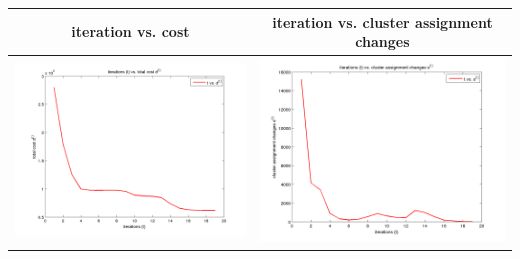 \documentclass[fleqn]{article}
\begin{document}
\begin{center}
  \begin{longtable}{ c | c }
	\multicolumn{1}{c}{iteration vs. cost} & 
	\multicolumn{1}{c}{iteration vs. cluster assignment changes}  \\
    \hline
    \includegraphics[scale=0.4]{./pics/task1and2/spectrum_k=7_random2/t_vs_d_random_7_spectrum.png}  & \includegraphics[scale=0.4]{./pics/task1and2/spectrum_k=7_random2/t_vs_s_random_7_spectrum.png} \\
    \hline
  \end{longtable}
\end{center}
\end{document}
